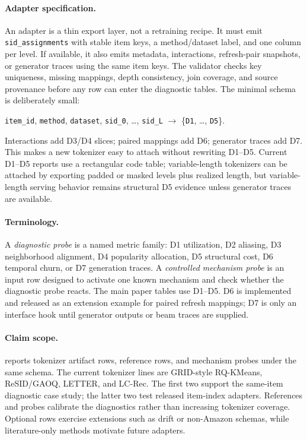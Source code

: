 \paragraph{Adapter specification.}
An adapter is a thin export layer, not a retraining recipe. It must emit
\texttt{sid\_assignments} with stable item keys, a method/dataset label, and
one column per \sid level. If available, it also emits metadata, interactions,
refresh-pair snapshots, or generator traces using the same item keys. The
validator checks key uniqueness, missing mappings, depth consistency, join
coverage, and source provenance before any row can enter the diagnostic tables.
The minimal schema is deliberately small:
\begin{center}
\small
\texttt{item\_id}, \texttt{method}, \texttt{dataset}, \texttt{sid\_0}, \ldots,
\texttt{sid\_L} $\rightarrow$ \{\texttt{D1}, \ldots, \texttt{D5}\}.
\end{center}
Interactions add D3/D4 slices; paired mappings add D6; generator traces add
D7. This makes a new tokenizer easy to attach without rewriting D1--D5.
Current D1--D5 reports use a rectangular code table; variable-length tokenizers
can be attached by exporting padded or masked levels plus realized length, but
variable-length serving behavior remains structural D5 evidence unless
generator traces are available.

\paragraph{Terminology.}
A \emph{diagnostic probe} is a named metric family: D1 utilization, D2
aliasing, D3 neighborhood alignment, D4 popularity allocation, D5 structural
cost, D6 temporal churn, or D7 generation traces. A \emph{controlled mechanism
probe} is an input row designed to activate one known mechanism and check
whether the diagnostic probe reacts. The main paper tables use D1--D5. D6 is
implemented and released as an extension example for paired refresh mappings;
D7 is only an interface hook until generator outputs or beam
traces are supplied.

\paragraph{Claim scope.}
\tool reports tokenizer artifact rows, reference rows, and mechanism probes
under the same schema. The current tokenizer lines are GRID-style RQ-KMeans,
ReSID/GAOQ, LETTER, and LC-Rec. The first two support the same-item diagnostic
case study; the latter two test released item-index adapters. References and
probes calibrate the diagnostics rather than increasing tokenizer coverage. Optional
rows exercise extensions such as drift or non-Amazon schemas, while
literature-only methods motivate future adapters.

